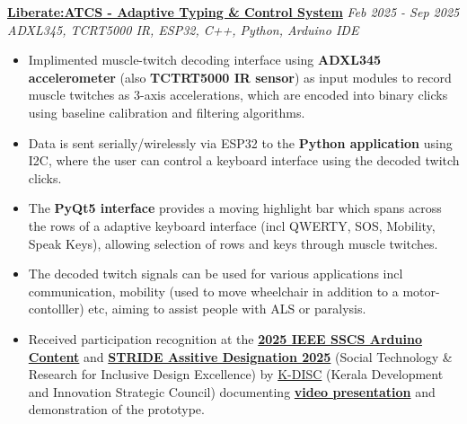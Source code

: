 \documentclass[a4paper]{article}
\begin{document}
\textbf{\href{https://liberate-atcs.vercel.app/}{Liberate:ATCS - Adaptive Typing \& Control System}} \hfill \textit{Feb 2025 - Sep 2025}\\
{\sl ADXL345, TCRT5000 IR, ESP32, C++, Python, Arduino IDE}
\begin{itemize} \itemsep 1pt
    \item Implimented muscle-twitch decoding interface using \textbf{ADXL345 accelerometer} (also \textbf{TCTRT5000 IR sensor}) as input modules to record muscle twitches as 3-axis accelerations, which are encoded into binary clicks using baseline calibration and filtering algorithms.
    \item Data is sent serially/wirelessly via ESP32 to the \textbf{Python application} using I2C, where the user can control a keyboard interface using the decoded twitch clicks.
    \item The \textbf{PyQt5 interface} provides a moving highlight bar which spans across the rows of a adaptive keyboard interface (incl QWERTY, SOS, Mobility, Speak Keys), allowing selection of rows and keys through muscle twitches.
    \item  The decoded twitch signals can be used for various applications incl communication, mobility (used to move wheelchair in addition to a motor-contolller) etc, aiming to assist people with ALS or paralysis.
    \item Received participation recognition at the \textbf{\href{https://sscs.ieee.org/education/sscs-arduino-contest/}{2025 IEEE SSCS Arduino Content}} and \textbf{\href{https://stridedesignathon.ieee-link.org/}{STRIDE Assitive Designation 2025}} (Social Technology \& Research for Inclusive Design Excellence) by \href{https://kdisc.kerala.gov.in/en/}{K-DISC} (Kerala Development and Innovation Strategic Council) documenting \textbf{\href{https://youtu.be/9NmNVjKmtew?si=vOsgkYYBrDFDhQ74}{video presentation}} and demonstration of the prototype.
\end{itemize}
\end{document}
